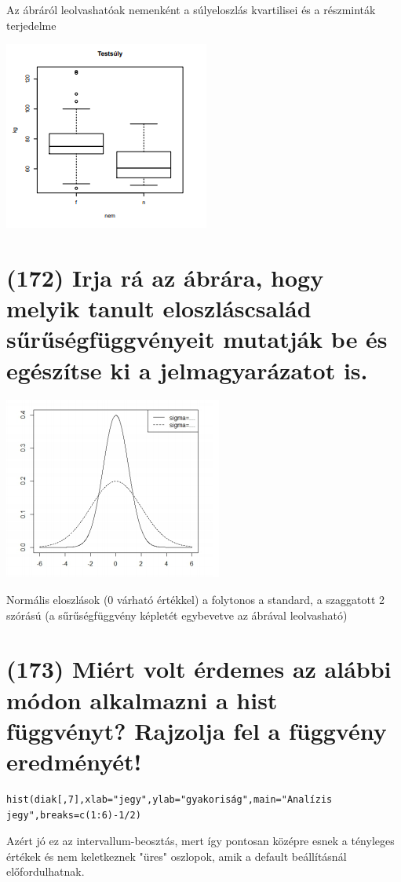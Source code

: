 \documentclass[12p]{article}
\begin{document}
Az ábráról leolvashatóak nemenként a súlyeloszlás kvartilisei és a részminták terjedelme

\includegraphics{boxplot}

\section{(172) Irja rá az ábrára, hogy melyik tanult eloszláscsalád sűrűségfüggvényeit mutatják be és
egészítse ki a jelmagyarázatot is.}

\includegraphics{fuggveny}

 Normális eloszlások (0 várható értékkel) a folytonos a standard, a szaggatott 2 szórású
(a sűrűségfüggvény képletét egybevetve az ábrával leolvasható)


\section{(173) Miért volt érdemes az alábbi módon alkalmazni a hist függvényt? Rajzolja fel a függvény eredményét! }

\begin{verbatim}
hist(diak[,7],xlab="jegy",ylab="gyakoriság",main="Analízis
jegy",breaks=c(1:6)-1/2)
\end{verbatim}

Azért jó ez az intervallum-beosztás, mert így pontosan középre esnek a tényleges értékek
és nem keletkeznek "üres" oszlopok, amik a default beállításnál előfordulhatnak.
\end{document}
